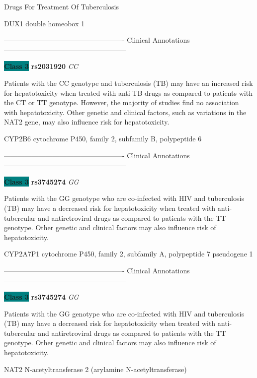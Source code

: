 \documentclass{resume} %
\begin{document}
\begin{rSection}{ Drugs For Treatment Of Tuberculosis }
\begin{rSubsection}{ DUX1 }{ double homeobox 1 }{}{}
\item[] ---------------------------------------------------- Clinical Annotations -----------------------------------------------------\newline
\item \textbf{\colorbox{teal} {Class 3}} \textbf{ rs2031920 } \textit{ CC }
\item[] Patients with the CC genotype and tuberculosis (TB) may have an increased risk for hepatotoxicity when treated with anti-TB drugs as compared to patients with the CT or TT genotype. However, the majority of studies find no association with hepatotoxicity. Other genetic and clinical factors, such as variations in the NAT2 gene, may also influence risk for hepatotoxicity.
\end{rSubsection}\begin{rSubsection}{ CYP2B6 }{ cytochrome P450, family 2, subfamily B, polypeptide 6 }{}{}
\item[]

\item[] ---------------------------------------------------- Clinical Annotations -----------------------------------------------------\newline
\item \textbf{\colorbox{teal} {Class 3}} \textbf{ rs3745274 } \textit{ GG }
\item[] Patients with the GG genotype who are co-infected with HIV and tuberculosis (TB) may have a decreased risk for hepatotoxicity when treated with anti-tubercular and antiretroviral drugs as compared to patients with the TT genotype. Other genetic and clinical factors may also influence risk of hepatotoxicity.
\end{rSubsection}\begin{rSubsection}{ CYP2A7P1 }{ cytochrome P450, family 2, subfamily A, polypeptide 7 pseudogene 1 }{}{}
\item[]

\item[] ---------------------------------------------------- Clinical Annotations -----------------------------------------------------\newline
\item \textbf{\colorbox{teal} {Class 3}} \textbf{ rs3745274 } \textit{ GG }
\item[] Patients with the GG genotype who are co-infected with HIV and tuberculosis (TB) may have a decreased risk for hepatotoxicity when treated with anti-tubercular and antiretroviral drugs as compared to patients with the TT genotype. Other genetic and clinical factors may also influence risk of hepatotoxicity.
\end{rSubsection}\begin{rSubsection}{ NAT2 }{ N-acetyltransferase 2 (arylamine N-acetyltransferase) }{}{}
\item[]


\end{rSubsection}
\end{rSection}
\end{document}
